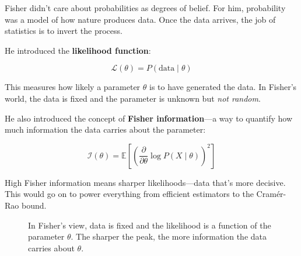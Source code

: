 Fisher didn’t care about probabilities as degrees of belief. For him, probability was a model of how nature produces data. Once the data arrives, the job of statistics is to invert the process.

He introduced the \textbf{likelihood function}:

\[
\mathcal{L}(\theta) = P(\text{data} \mid \theta)
\]

This measures how likely a parameter \( \theta \) is to have generated the data. In Fisher’s world, the data is fixed and the parameter is unknown but \textit{not random}.

He also introduced the concept of \textbf{Fisher information}—a way to quantify how much information the data carries about the parameter:

\[
\mathcal{I}(\theta) = \mathbb{E}\left[ \left( \frac{\partial}{\partial \theta} \log P(X \mid \theta) \right)^2 \right]
\]

High Fisher information means sharper likelihoods—data that’s more decisive. This would go on to power everything from efficient estimators to the Cramér-Rao bound.

\begin{figure}[H]
\centering
{}
\caption{In Fisher’s view, data is fixed and the likelihood is a function of the parameter \( \theta \). The sharper the peak, the more information the data carries about \( \theta \).}
\end{figure}


